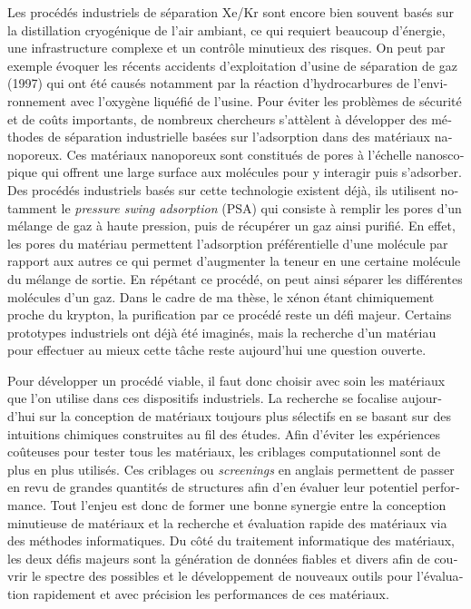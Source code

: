 \documentclass[thesis]{subfiles}
\begin{document}
\begin{otherlanguage}{french}
Les procédés industriels de séparation Xe/Kr sont encore bien souvent basés sur la distillation cryogénique de l'air ambiant, ce qui requiert beaucoup d'énergie, une infrastructure complexe et un contrôle minutieux des risques. On peut par exemple évoquer les récents accidents d'exploitation d'usine de séparation de gaz (1997) qui ont été causés notamment par la réaction d'hydrocarbures de l'environnement avec l'oxygène liquéfié de l'usine. Pour éviter les problèmes de sécurité et de coûts importants, de nombreux chercheurs s'attèlent à développer des méthodes de séparation industrielle basées sur l'adsorption dans des matériaux nanoporeux. Ces matériaux nanoporeux sont constitués de pores à l'échelle nanoscopique qui offrent une large surface aux molécules pour y interagir puis s'adsorber. Des procédés industriels basés sur cette technologie existent déjà, ils utilisent notamment le \emph{pressure swing adsorption} (PSA) qui consiste à remplir les pores d'un mélange de gaz à haute pression, puis de récupérer un gaz ainsi purifié. En effet, les pores du matériau permettent l'adsorption préférentielle d'une molécule par rapport aux autres ce qui permet d'augmenter la teneur en une certaine molécule du mélange de sortie. En répétant ce procédé, on peut ainsi séparer les différentes molécules d'un gaz. Dans le cadre de ma thèse, le xénon étant chimiquement proche du krypton, la purification par ce procédé reste un défi majeur. Certains prototypes industriels ont déjà été imaginés, mais la recherche d'un matériau pour effectuer au mieux cette tâche reste aujourd'hui une question ouverte. 

Pour développer un procédé viable, il faut donc choisir avec soin les matériaux que l'on utilise dans ces dispositifs industriels. La recherche se focalise aujourd'hui sur la conception de matériaux toujours plus sélectifs en se basant sur des intuitions chimiques construites au fil des études. Afin d'éviter les expériences coûteuses pour tester tous les matériaux, les criblages computationnel sont de plus en plus utilisés. Ces criblages ou \emph{screenings} en anglais permettent de passer en revu de grandes quantités de structures afin d'en évaluer leur potentiel performance. Tout l'enjeu est donc de former une bonne synergie entre la conception minutieuse de matériaux et la recherche et évaluation rapide des matériaux via des méthodes informatiques. Du côté du traitement informatique des matériaux, les deux défis majeurs sont la génération de données fiables et divers afin de couvrir le spectre des possibles et le développement de nouveaux outils pour l'évaluation rapidement et avec précision les performances de ces matériaux. 


\end{otherlanguage}
\end{document}
